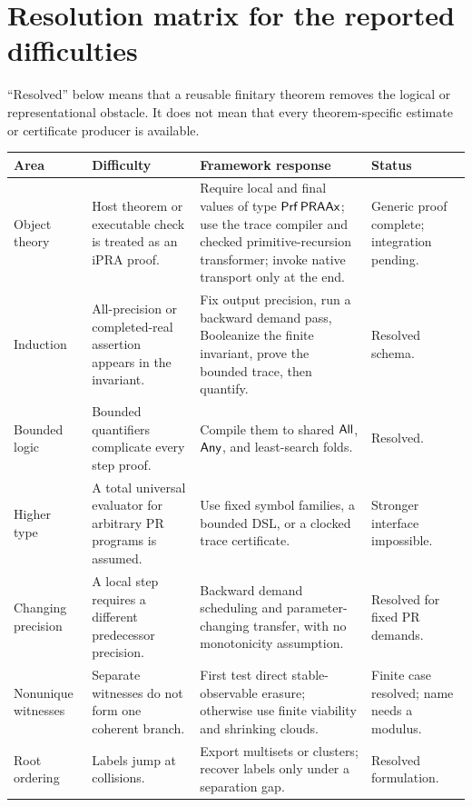 \section{Resolution matrix for the reported difficulties}
\label{sec:matrix}

``Resolved'' below means that a reusable finitary theorem removes the logical
or representational obstacle.  It does not mean that every theorem-specific
estimate or certificate producer is available.

\begin{longtable}{@{}>{\raggedright\arraybackslash}p{}>{\raggedright\arraybackslash}p{}>{\raggedright\arraybackslash}p{}>{\raggedright\arraybackslash}p{}@{}}
\toprule
Area & Difficulty & Framework response & Status \\
\midrule
\endhead
Object theory & Host theorem or executable check is treated as an iPRA proof. &
Require local and final values of type \(\mathsf{Prf}\,\mathsf{PRAAx}\); use the trace compiler
and checked primitive-recursion transformer; invoke native transport only at the
end. & Generic proof complete; integration pending.\\
\addlinespace
Induction & All-precision or completed-real assertion appears in the invariant. &
Fix output precision, run a backward demand pass, Booleanize the finite
invariant, prove the bounded trace, then quantify. & Resolved schema.\\
\addlinespace
Bounded logic & Bounded quantifiers complicate every step proof. & Compile them
to shared \(\mathsf{All}\), \(\mathsf{Any}\), and least-search folds. & Resolved.\\
\addlinespace
Higher type & A total universal evaluator for arbitrary PR programs is assumed. &
Use fixed symbol families, a bounded DSL, or a clocked trace certificate. &
Stronger interface impossible.\\
\addlinespace
Changing precision & A local step requires a different predecessor precision. &
Backward demand scheduling and parameter-changing transfer, with no monotonicity
assumption. & Resolved for fixed PR demands.\\
\addlinespace
Nonunique witnesses & Separate witnesses do not form one coherent branch. &
First test direct stable-observable erasure; otherwise use finite viability and
shrinking clouds. & Finite case resolved; name needs a modulus.\\
\addlinespace
Root ordering & Labels jump at collisions. & Export multisets or clusters;
recover labels only under a separation gap. & Resolved formulation.\\

\end{longtable}
